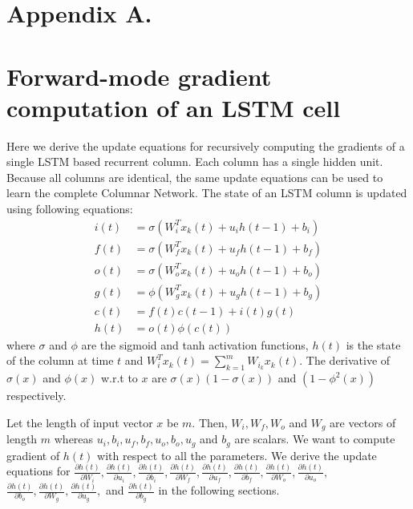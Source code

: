 \documentclass[twoside,11pt]{article}
\begin{document}



\newpage

\appendix
\section*{Appendix A.}

\section{Forward-mode gradient computation of an LSTM cell }

Here we derive the update equations for recursively computing the gradients of a single LSTM based recurrent column. Each column has a single hidden unit. Because all columns are identical, the same update equations can be used to learn the complete Columnar Network.  The state of an LSTM column is updated using following equations: 
\begin{align}
i(t) &= \sigma( W_{i}^T x_k(t) + u_{i} h(t-1) + b_i) \label{i} \\
f(t) &= \sigma( W_{f}^T x_k(t) + u_{f} h(t-1) + b_f) \label{f} \\
o(t) &= \sigma( W_{o}^T x_k(t) + u_{o} h(t-1) + b_o) \label{o} \\
g(t) &= \phi( W_{g}^T x_k(t) + u_{g} h(t-1) + b_g) \label{g} \\
c(t) &= f(t)  c(t-1) + i(t) g(t) \label{c} \\
h(t) &= o(t)  \phi(c(t)) \label{state_update}
\end{align}
where $\sigma$ and $\phi$ are the sigmoid and tanh activation functions, $h(t)$ is the state of the column at time $t$ and $ W_{i}^T x_k(t) = \sum_{k=1}^m W_{i_k} x_k(t)$. The derivative of $\sigma(x)$ and $\phi(x)$ w.r.t to $x$ are $\sigma(x)(1-\sigma(x))$ and $(1-\phi^2(x))$ respectively.

Let the length of input vector $x$ be $m$. Then, $W_{i}, W_{f}, W_{o}$ and $W_{g}$ are vectors of length $m$ whereas $u_i, b_i, u_f, b_f, u_o, b_o, u_g$ and $b_g$ are scalars. We want to compute gradient of $h(t)$ with respect to all the parameters. We derive the update equations for $\frac{\partial h(t)}{\partial W_{i}} ,\frac{\partial h(t)}{\partial u_{i}}, $$\frac{\partial h(t)}{\partial b_{i}}, \frac{\partial h(t)}{\partial W_{f}} $$,\frac{\partial h(t)}{\partial u_{f}}, \frac{\partial h(t)}{\partial b_{f}}, $$\frac{\partial h(t)}{\partial W_{o}} ,\frac{\partial h(t)}{\partial u_{o}},$$ \frac{\partial h(t)}{\partial b_{o}}, \frac{\partial h(t)}{\partial W_{g}} ,\frac{\partial h(t)}{\partial u_{g}},$ and $\frac{\partial h(t)}{\partial b_{g}}$ in the following sections. 
\end{document}
